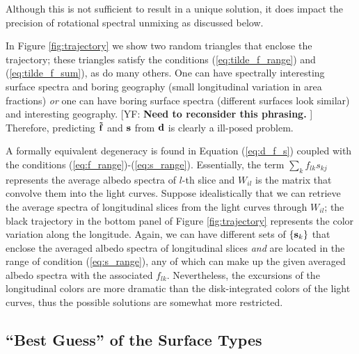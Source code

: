 \documentclass[iop,numberedappendix,apj,]{emulateapj}
\def\fast{\tilde f}
\def\memoYF#1{\color{red}[YF: {\bf #1}]\color{black}}
\begin{document}
Although this is not sufficient to result in a unique solution, it does impact the precision of rotational spectral unmixing as discussed below. 

In Figure \ref{fig:trajectory} we show two random triangles that enclose the trajectory; these triangles satisfy the conditions (\ref{eq:tilde_f_range}) and (\ref{eq:tilde_f_sum}), as do many others. 
One can have spectrally interesting surface spectra and boring geography (small longitudinal variation in area fractions) {\it or} one can have boring surface spectra (different surfaces look similar) and interesting geography. \memoYF{Need to reconsider this phrasing. }
Therefore, predicting ${\bf \fast }$ and ${\bf s}$ from ${\bf d}$ is clearly a ill-posed problem. 

A formally equivalent degeneracy is found in Equation (\ref{eq:d_f_s}) coupled with the conditions (\ref{eq:f_range})-(\ref{eq:s_range}). 
Essentially, the term $\sum _k f_{lk} s_{kj}$ represents the average albedo spectra of $l$-th slice and $W_{il}$ is the matrix that convolve them into the light curves. 
Suppose idealistically that we can retrieve the average spectra of longitudinal slices from the light curves through $W_{il}$; the black trajectory in the bottom panel of Figure \ref{fig:trajectory} represents the color variation along the longitude.  
Again, we can have different sets of $\{ {\bf s}_k \}$ that enclose the averaged albedo spectra of longitudinal slices {\it and} are located in the range of condition (\ref{eq:s_range}), any of which can make up the given averaged albedo spectra with the associated $f_{lk}$. 
Nevertheless, the excursions of the longitudinal colors are more dramatic than the disk-integrated colors of the light curves, thus the possible solutions are somewhat more restricted. 


\subsection{``Best Guess'' of the Surface Types}
\label{ss:guess}
\end{document}
